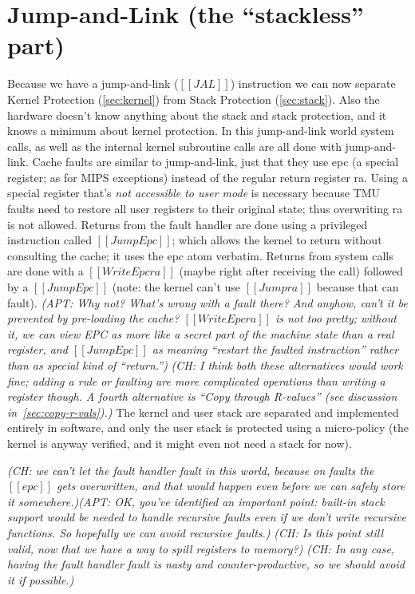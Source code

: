 \documentclass{article}
\newcommand{\ch}[1]{{\color{dkblue}\em (CH: #1)}}
\newcommand{\apt}[1]{{\color{red}\em (APT: #1)}}
\begin{document}
\section{Jump-and-Link (the ``stackless'' part)}

Because we have a jump-and-link ($[[JAL]]$) instruction we can now separate
Kernel Protection (\autoref{sec:kernel}) from Stack Protection
(\autoref{sec:stack}). Also the hardware doesn't know anything about
the stack and stack protection, and it knows a minimum about kernel
protection.
%
In this jump-and-link world system calls, as well as the
internal kernel subroutine calls are all done with jump-and-link.
%
Cache faults are similar to jump-and-link, just that they use epc (a
special register; as for MIPS exceptions) instead of the regular
return register ra.
%
Using a special register that's {\em not accessible to user mode} is
necessary because TMU faults need to restore all user registers to
their original state; thus overwriting ra is not allowed.
%
Returns from the fault handler are done using a privileged instruction
called $[[JumpEpc]]$; which allows the kernel to return without
consulting the cache; it uses the epc atom verbatim.
%
Returns from system calls are done with a $[[WriteEpc ra]]$ (maybe
right after receiving the call) followed by a $[[JumpEpc]]$ (note: the
kernel can't use $[[Jump ra]]$ because that can fault).
\apt{Why not? What's wrong with a fault there? And anyhow, can't it
be prevented by pre-loading the cache? $[[WriteEpc ra]]$ is not
too pretty; without it, we can view EPC as more like a secret
part of the machine state than a real register, and $[[JumpEpc]]$ 
as meaning ``restart the faulted instruction'' rather than as special
kind of ``return.''}
%
\ch{I think both these alternatives would work fine; adding a rule or
  faulting are more complicated operations than writing a register
  though.  A fourth alternative is ``Copy through R-values'' (see
  discussion in~\autoref{sec:copy-r-vals}).}
%
The kernel and user stack are separated and implemented entirely in
software, and only the user stack is protected using a micro-policy
(the kernel is anyway verified, and it might even not need a stack for
now).

\ch{we can't let the fault handler fault in this world, because on faults
  the $[[epc]]$ gets overwritten, and that would happen even before we
  can safely store it somewhere.}\apt{OK, you've identified an important point:
  built-in stack support would be needed to handle recursive \emph{faults} even
  if we don't write recursive functions. So hopefully we can avoid recursive faults.}
\ch{Is this point still valid, now that we have a way to spill registers to memory?}
%
\ch{In any case, having the fault handler fault is nasty and
  counter-productive, so we should avoid it if possible.}
\end{document}

